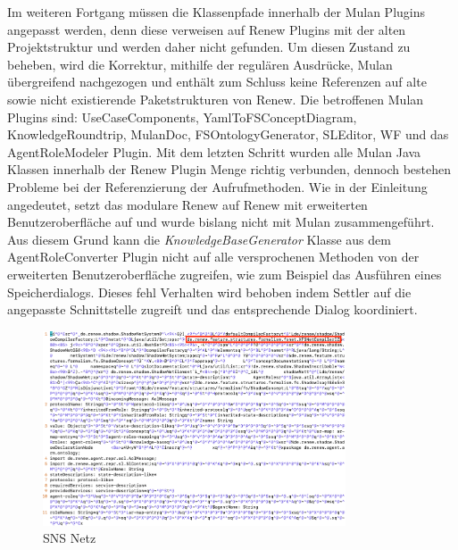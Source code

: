 	Im weiteren Fortgang müssen die Klassenpfade innerhalb der Mulan Plugins angepasst werden, denn diese verweisen auf Renew Plugins mit der alten Projektstruktur und werden daher nicht gefunden. Um diesen Zustand zu beheben, wird die Korrektur, mithilfe der regulären Ausdrücke, Mulan übergreifend nachgezogen und enthält zum Schluss keine Referenzen auf alte sowie nicht existierende Paketstrukturen von Renew. Die betroffenen Mulan Plugins sind: UseCaseComponents, YamlToFSConceptDiagram, KnowledgeRoundtrip, MulanDoc, FSOntologyGenerator, SLEditor, WF und das AgentRoleModeler Plugin. \newline
	Mit dem letzten Schritt wurden alle Mulan Java Klassen innerhalb der Renew Plugin Menge richtig verbunden, dennoch bestehen Probleme bei der Referenzierung der Aufrufmethoden. Wie in der Einleitung angedeutet, setzt das modulare Renew auf Renew mit erweiterten Benutzeroberfläche auf und wurde bislang nicht mit Mulan zusammengeführt. Aus diesem Grund kann die \textit{KnowledgeBaseGenerator} Klasse aus dem AgentRoleConverter Plugin nicht auf alle versprochenen Methoden von der erweiterten Benutzeroberfläche zugreifen, wie zum Beispiel das Ausführen eines Speicherdialogs. Dieses fehl Verhalten wird behoben indem Settler auf die angepasste Schnittstelle zugreift und das entsprechende Dialog koordiniert. \bigbreak

	\begin{figure}[h!]
	  \centering
	  \includegraphics[width=0.8\textwidth]{material/images/shadownet.png}
	  \caption{SNS Netz}
	  \label{fig:sns_netz}
	\end{figure}

